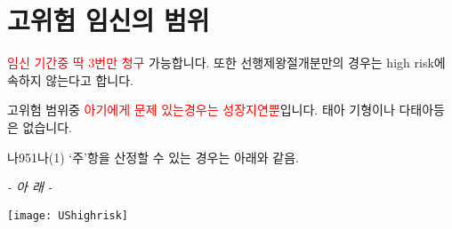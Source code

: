 \section{고위험 임신의 범위} %
\begin{commentbox}{}
\large \textcolor{red}{임신 기간중 딱 3번만 청구} 가능합니다. 또한 선행제왕절개분만의 경우는 high risk에 속하지 않는다고 합니다.\par
\large 고위험 범위중 \textcolor{red}{아기에게 문제 있는경우는 성장지연뿐}입니다. 태아 기형이나 다태아등은 없습니다.
\normalsize\par
\noindent 나951나(1) ‘주’항을 산정할 수 있는 경우는 아래와 같음. \par
\begin{center}\emph{- 아   래 -}\end{center}
\end{commentbox}%
\par
\texttt{[image: UShighrisk]}
\par
\medskip
\prezi{\clearpage}
